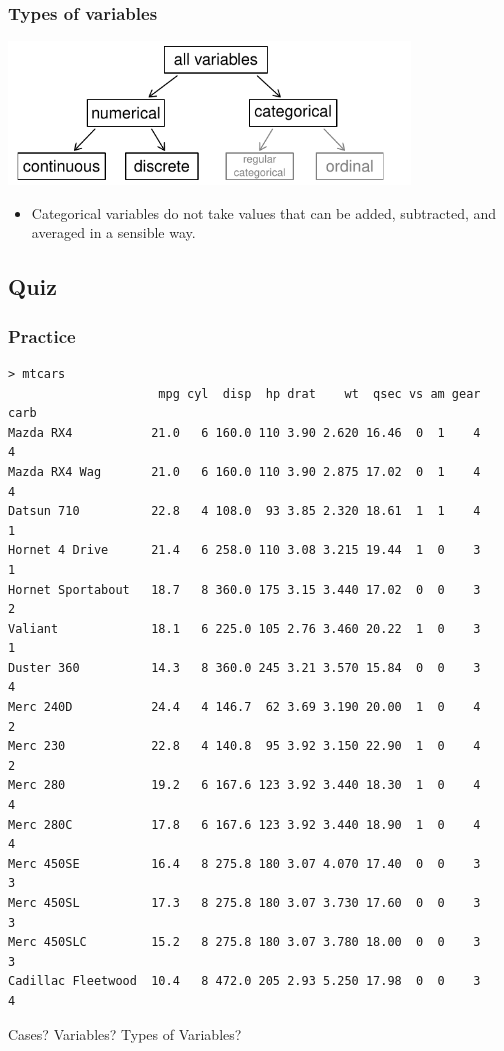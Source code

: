 \begin{frame}
\frametitle{Types of variables}

\begin{center}
\includegraphics[width=0.8\textwidth]{figures/variables/variables}
\end{center}

\begin{itemize}
\item Categorical variables do not take values that can be added, subtracted, and averaged in a sensible way.
\end{itemize}

\end{frame}


\subsection{Quiz}

\begin{frame}[fragile]
\frametitle{Practice}
{\scriptsize
\begin{verbatim}
> mtcars
                     mpg cyl  disp  hp drat    wt  qsec vs am gear carb
Mazda RX4           21.0   6 160.0 110 3.90 2.620 16.46  0  1    4    4
Mazda RX4 Wag       21.0   6 160.0 110 3.90 2.875 17.02  0  1    4    4
Datsun 710          22.8   4 108.0  93 3.85 2.320 18.61  1  1    4    1
Hornet 4 Drive      21.4   6 258.0 110 3.08 3.215 19.44  1  0    3    1
Hornet Sportabout   18.7   8 360.0 175 3.15 3.440 17.02  0  0    3    2
Valiant             18.1   6 225.0 105 2.76 3.460 20.22  1  0    3    1
Duster 360          14.3   8 360.0 245 3.21 3.570 15.84  0  0    3    4
Merc 240D           24.4   4 146.7  62 3.69 3.190 20.00  1  0    4    2
Merc 230            22.8   4 140.8  95 3.92 3.150 22.90  1  0    4    2
Merc 280            19.2   6 167.6 123 3.92 3.440 18.30  1  0    4    4
Merc 280C           17.8   6 167.6 123 3.92 3.440 18.90  1  0    4    4
Merc 450SE          16.4   8 275.8 180 3.07 4.070 17.40  0  0    3    3
Merc 450SL          17.3   8 275.8 180 3.07 3.730 17.60  0  0    3    3
Merc 450SLC         15.2   8 275.8 180 3.07 3.780 18.00  0  0    3    3
Cadillac Fleetwood  10.4   8 472.0 205 2.93 5.250 17.98  0  0    3    4
\end{verbatim}}
Cases? Variables? Types of Variables?

\end{frame}


